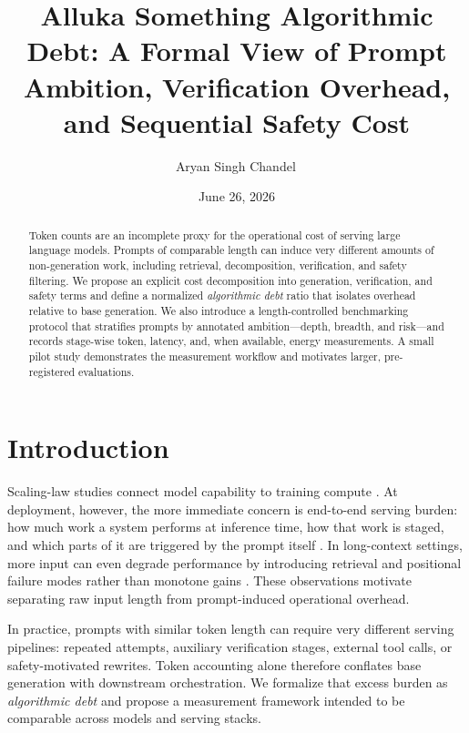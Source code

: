 \documentclass{svjour3}
\title{Alluka Something Algorithmic Debt: A Formal View of Prompt Ambition, Verification Overhead, and Sequential Safety Cost}
\author{Aryan Singh Chandel\,\orcidlink{0009-0007-1774-2480}}
\institute{Aryan Singh Chandel \at
  RJIT (Rustamji Institute of Technology), Gwalior, India \\
  \email{aryansingh19gh@gmail.com}
}
\date{June 26, 2026}
\begin{document}
\maketitle

\begin{abstract}
Token counts are an incomplete proxy for the operational cost of serving large language models. Prompts of comparable length can induce very different amounts of non-generation work, including retrieval, decomposition, verification, and safety filtering. We propose an explicit cost decomposition into generation, verification, and safety terms and define a normalized \emph{algorithmic debt} ratio that isolates overhead relative to base generation. We also introduce a length-controlled benchmarking protocol that stratifies prompts by annotated ambition---depth, breadth, and risk---and records stage-wise token, latency, and, when available, energy measurements. A small pilot study demonstrates the measurement workflow and motivates larger, pre-registered evaluations.
\end{abstract}

\section{Introduction}
Scaling-law studies connect model capability to training compute \cite{kaplan2020scaling,hoffmann2022chinchilla}. At deployment, however, the more immediate concern is end-to-end serving burden: how much work a system performs at inference time, how that work is staged, and which parts of it are triggered by the prompt itself \cite{wu2024inferencescaling,tokenbudget2024}. In long-context settings, more input can even degrade performance by introducing retrieval and positional failure modes rather than monotone gains \cite{liu2023lost}. These observations motivate separating raw input length from prompt-induced operational overhead.

In practice, prompts with similar token length can require very different serving pipelines: repeated attempts, auxiliary verification stages, external tool calls, or safety-motivated rewrites. Token accounting alone therefore conflates base generation with downstream orchestration. We formalize that excess burden as \emph{algorithmic debt} and propose a measurement framework intended to be comparable across models and serving stacks.
\end{document}
